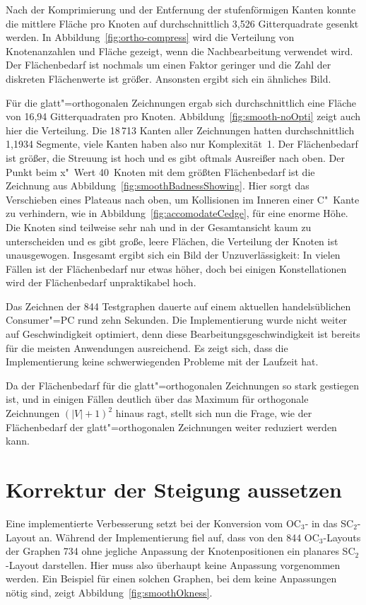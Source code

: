 \documentclass[a4paper]{scrreprt}
\theoremstyle{definition}
\begin{document}
Nach der Komprimierung und der Entfernung der stufenförmigen Kanten konnte die mittlere Fläche pro Knoten auf durchschnittlich 3,526 Gitterquadrate gesenkt werden. In Abbildung~\ref{fig:ortho-compress} wird die Verteilung von Knotenanzahlen und Fläche gezeigt, wenn die Nachbearbeitung verwendet wird. Der Flächenbedarf ist nochmals um einen Faktor  geringer und die Zahl der diskreten Flächenwerte ist größer. Ansonsten ergibt sich ein ähnliches Bild.

Für die glatt"=orthogonalen Zeichnungen ergab sich durchschnittlich eine Fläche von 16,94 Gitterquadraten pro Knoten. Abbildung~\ref{fig:smooth-noOpti} zeigt auch hier die Verteilung. Die 18\,713 Kanten aller Zeichnungen hatten durchschnittlich 1,1934 Segmente, viele Kanten haben also nur Komplexität~1. Der Flächenbedarf ist größer, die Streuung ist hoch und es gibt oftmals Ausreißer nach oben. Der Punkt beim x"~Wert 40~Knoten mit dem größten Flächenbedarf ist die Zeichnung aus Abbildung~\ref{fig:smoothBadnessShowing}. Hier sorgt das Verschieben eines Plateaus nach oben, um Kollisionen im Inneren einer C"~Kante zu verhindern, wie in Abbildung~\ref{fig:accomodateCedge}, für eine enorme Höhe. Die Knoten sind teilweise sehr nah und in der Gesamtansicht kaum zu unterscheiden und es gibt große, leere Flächen, die Verteilung der Knoten ist unausgewogen. Insgesamt ergibt sich ein Bild der Unzuverlässigkeit: In vielen Fällen ist der Flächenbedarf nur etwas höher, doch bei einigen Konstellationen wird der Flächenbedarf unpraktikabel hoch.

Das Zeichnen der 844 Testgraphen dauerte auf einem aktuellen handelsüblichen Consumer"=PC rund zehn Sekunden. Die Implementierung wurde nicht weiter auf Geschwindigkeit optimiert, denn diese Bearbeitungsgeschwindigkeit ist bereits für die meisten Anwendungen ausreichend. Es zeigt sich, dass die Implementierung keine schwerwiegenden Probleme mit der Laufzeit hat.

Da der Flächenbedarf für die glatt"=orthogonalen Zeichnungen so stark gestiegen ist, und in einigen Fällen deutlich über das Maximum für orthogonale Zeichnungen $(|V|+1)^2$ hinaus ragt, stellt sich nun die Frage, wie der Flächenbedarf der glatt"=orthogonalen Zeichnungen weiter reduziert werden kann.

\section{Korrektur der Steigung aussetzen}

Eine implementierte Verbesserung setzt bei der Konversion vom OC$_3$- in das SC$_2$-Layout an. Während der Implementierung fiel auf, dass von den 844 OC$_3$-Layouts der Graphen 734 ohne jegliche Anpassung der Knotenpositionen ein planares SC$_2$-Layout darstellen. Hier muss also überhaupt keine Anpassung vorgenommen werden. Ein Beispiel für einen solchen Graphen, bei dem keine Anpassungen nötig sind, zeigt Abbildung~\ref{fig:smoothOkness}.
\end{document}

